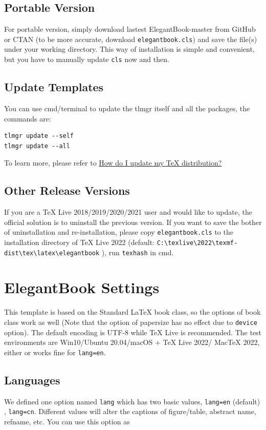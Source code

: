 \documentclass[11pt,bibtex]{elegantbook}
\begin{document}
\section{Portable Version}
For portable version, simply download lastest ElegantBook-master from GitHub or CTAN (to be more accurate, download \lstinline{elegantbook.cls}) and save the file(s) under your working directory. This way of installation is simple and convenient, but you have to manually update \lstinline{cls} now and then.


\section{Update Templates}
You can use cmd/terminal to update the tlmgr itself and all the packages, the commands are:
\begin{lstlisting}
tlmgr update --self
tlmgr update --all
\end{lstlisting}

To learn more, please refer to \href{https://tex.stackexchange.com/questions/55437/how-do-i-update-my-tex-distribution}{How do I update my \TeX{} distribution?}

\section{Other Release Versions}
If you are a \TeX{} Live 2018/2019/2020/2021 user and would like to update, the official solution is to uninstall the previous version. If you want to save the bother of uninstallation and re-installation, please copy \lstinline{elegantbook.cls} to the installation directory of \TeX{} Live 2022 (default: \lstinline|C:\texlive\2022\texmf-dist\tex\latex\elegantbook| ), run \lstinline{texhash} in cmd.

\chapter{ElegantBook Settings}
This template is based on the Standard \LaTeX{} book class, so the options of book class work as well (Note that the option of papersize has no effect due to \lstinline{device} option). The default encoding is UTF-8 while \TeX{} Live is recommended. The test environments are Win10/Ubuntu 20.04/macOS + \TeX{} Live 2022/ Mac\TeX{} 2022, either  or  works fine for \lstinline{lang=en}.

\section{Languages}
We defined one option named \lstinline{lang} which has two basic values, \lstinline{lang=en} (default) , \lstinline{lang=cn}. Different values will alter the captions of figure/table, abstract name, refname, etc. You can use this option as
\end{document}
